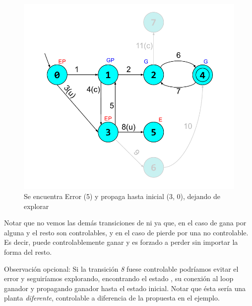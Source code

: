 \begin{figure}
 \centering
 \includegraphics[scale=0.6]{figures/ejemplo_on-the-fly/4.pdf}
 \caption{Se encuentra Error (5) y propaga hasta inicial (3, 0), dejando de explorar}
 \label{fig:ej:exploracion4}
\end{figure}

Notar que no vemos las demás transiciones de  ni  ya que, en el caso de  gana por alguna y el resto son controlables, y en el caso de  pierde por una no controlable. Es decir,  puede controlablemente ganar y  es forzado a perder sin importar la forma del resto.

Observación opcional: Si la transición \textit{8} fuese controlable podríamos evitar el error y seguiríamos explorando, encontrando el estado , su conexión al loop ganador y propagando ganador hasta el estado inicial. Notar que ésta sería una planta \textit{diferente}, controlable a diferencia de la propuesta en el ejemplo.














